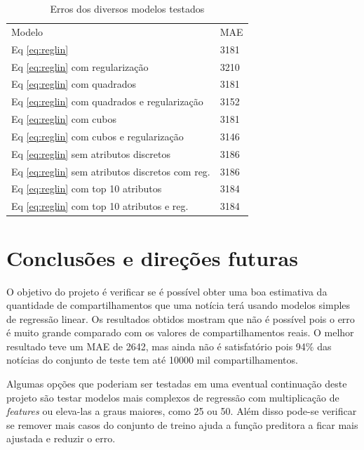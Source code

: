\documentclass[10pt,twocolumn,letterpaper]{article}
\begin{document}
\begin{table}[]
\centering
\label{tab:result}
\caption{Erros dos diversos modelos testados}
\begin{tabular}{ll}
Modelo & MAE \\
Eq \ref{eq:reglin} & 3181 \\
Eq \ref{eq:reglin} com regularização & 3210 \\
Eq \ref{eq:reglin} com quadrados & 3181 \\
Eq \ref{eq:reglin} com quadrados e regularização & 3152 \\
Eq \ref{eq:reglin} com cubos & 3181 \\
Eq \ref{eq:reglin} com cubos e regularização & 3146 \\
Eq \ref{eq:reglin} sem atributos discretos & 3186 \\
Eq \ref{eq:reglin} sem atributos discretos com reg. & 3186 \\
Eq \ref{eq:reglin} com top 10 atributos & 3184 \\
Eq \ref{eq:reglin} com top 10 atributos e reg. & 3184
\end{tabular}
\end{table}

\section{Conclusões e direções futuras}

O objetivo do projeto é verificar se é possível obter uma boa estimativa da quantidade de compartilhamentos que uma notícia terá usando modelos simples de regressão linear. Os resultados obtidos mostram que não é possível pois o erro é muito grande comparado com os valores de compartilhamentos reais. O melhor resultado teve um MAE de 2642, mas ainda não é satisfatório pois 94$\%$ das notícias do conjunto de teste tem até 10000 mil compartilhamentos.

Algumas opções que poderiam ser testadas em uma eventual continuação deste projeto são testar modelos mais complexos de regressão com multiplicação de \textit{features} ou eleva-las a graus maiores, como 25 ou 50. Além disso pode-se verificar se remover mais casos do conjunto de treino ajuda a função preditora a ficar mais ajustada e reduzir o erro. 

{\small


}
\end{document}
